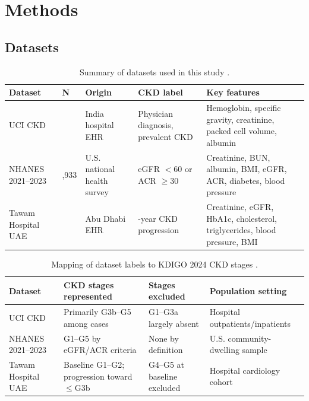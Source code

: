 \documentclass[12pt]{article}
\begin{document}
\section{Methods}
\subsection{Datasets}
\begin{table}[H]
\centering
\caption{Summary of datasets used in this study \cite{rubini2015,cdc2024,alshamsi2018}.}
\small
\renewcommand{\arraystretch}{1.18}
\setlength{\tabcolsep}{5pt}
\begin{tabularx}{\textwidth}{|>{\raggedright\arraybackslash}p{2.2cm}|>{\centering\arraybackslash}p{1.1cm}|>{\raggedright\arraybackslash}X|>{\raggedright\arraybackslash}X|>{\raggedright\arraybackslash}X|}
\hline
\textbf{Dataset} & \textbf{N} & \textbf{Origin} & \textbf{CKD label} & \textbf{Key features} \\
\hline
UCI CKD & 400 & India hospital EHR & Physician diagnosis, prevalent CKD & Hemoglobin, specific gravity, creatinine, packed cell volume, albumin \\
\hline
NHANES 2021--2023 & 11,933 & U.S. national health survey & eGFR $<60$ or ACR $\ge 30$ & Creatinine, BUN, albumin, BMI, eGFR, ACR, diabetes, blood pressure \\
\hline
Tawam Hospital UAE & 491 & Abu Dhabi EHR & 8-year CKD progression & Creatinine, eGFR, HbA1c, cholesterol, triglycerides, blood pressure, BMI \\
\hline
\end{tabularx}
\end{table}

\begin{table}[H]
\centering
\caption{Mapping of dataset labels to KDIGO 2024 CKD stages \cite{kdigo2024}.}
\small
\renewcommand{\arraystretch}{1.18}
\setlength{\tabcolsep}{5pt}
\begin{tabularx}{\textwidth}{|>{\raggedright\arraybackslash}p{2.4cm}|>{\raggedright\arraybackslash}X|>{\raggedright\arraybackslash}X|>{\raggedright\arraybackslash}X|}
\hline
\textbf{Dataset} & \textbf{CKD stages represented} & \textbf{Stages excluded} & \textbf{Population setting} \\
\hline
UCI CKD & Primarily G3b--G5 among cases & G1--G3a largely absent & Hospital outpatients/inpatients \\
\hline
NHANES 2021--2023 & G1--G5 by eGFR/ACR criteria & None by definition & U.S. community-dwelling sample \\
\hline
Tawam Hospital UAE & Baseline G1--G2; progression toward $\le$G3b & G4--G5 at baseline excluded & Hospital cardiology cohort \\
\hline
\end{tabularx}
\end{table}
\end{document}
